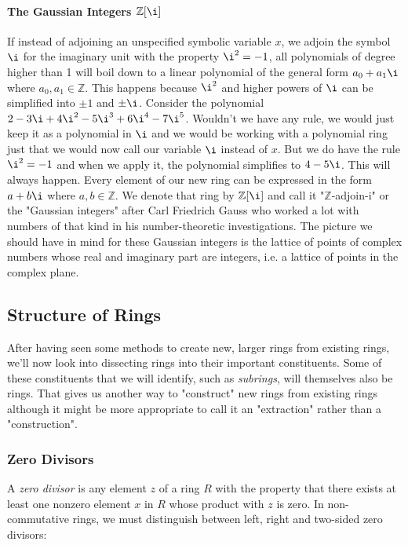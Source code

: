 \paragraph{The Gaussian Integers $\mathbb{Z}[\i]$}
If instead of adjoining an unspecified symbolic variable $x$, we adjoin the symbol $\i$ for the imaginary unit with the property $\i^2 = -1$, all polynomials of degree higher than 1 will boil down to a linear polynomial of the general form $a_0 + a_1 \i$ where $a_0,a_1 \in \mathbb{Z}$. This happens because $\i^2$ and higher powers of $\i$ can be simplified into $\pm 1$ and $\pm \i$. Consider the polynomial $2 - 3 \i + 4 \i^2 - 5 \i^3 + 6 \i^4 - 7 \i^5$. Wouldn't we have any rule, we would just keep it as a polynomial in $\i$ and we would be working with a polynomial ring just that we would now call our variable $\i$ instead of $x$. But we do have the rule $\i^2 = -1$ and when we apply it, the polynomial simplifies to $4 - 5 \i$. This will always happen. Every element of our new ring can be expressed in the form $a + b \i$ where $a,b \in \mathbb{Z}$. We denote that ring by $\mathbb{Z}[\i]$ and call it "$\mathbb{Z}$-adjoin-i" or the "Gaussian integers" after Carl Friedrich Gauss who worked a lot with numbers of that kind in his number-theoretic investigations. The picture we should have in mind for these Gaussian integers is the lattice of points of complex numbers whose real and imaginary part are integers, i.e. a lattice of points in the complex plane.














\subsection{Structure of Rings}
After having seen some methods to create new, larger rings from existing rings, we'll now look into dissecting rings into their important constituents. Some of these constituents that we will identify, such as \emph{subrings}, will themselves also be rings. That gives us another way to "construct" new rings from existing rings although it might be more appropriate to call it an "extraction" rather than a "construction".


\subsubsection{Zero Divisors}
A \emph{zero divisor} is any element $z$ of a ring $R$ with the property that there exists at least one nonzero element $x$ in $R$ whose product with $z$ is zero. In non-commutative rings, we must distinguish between left, right and two-sided zero divisors:

